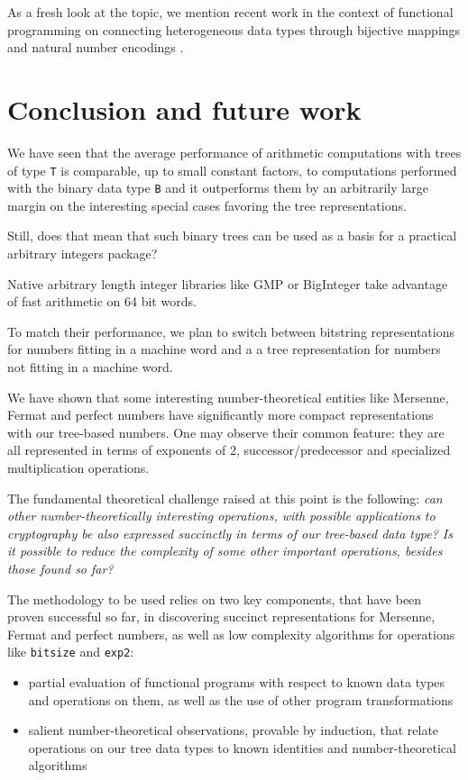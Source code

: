 \documentclass{TOOLS/llncs}
\begin{document}
As a fresh look at the topic, we mention 
recent work in the context of
functional programming on
connecting heterogeneous data types through
bijective mappings and natural number 
encodings \cite{everybit,complambda,calc10tarau}.


\section{Conclusion and future work} \label{concl}

We have seen that
the average performance of
arithmetic computations with  trees of type {\tt T}
is comparable, up to small constant
factors, to computations performed
with the binary data type {\tt B}
and it outperforms them by an arbitrarily large margin on the
interesting special cases favoring the tree representations.

Still, does that
mean that such binary trees can be used as a basis
for a practical arbitrary integers package?

Native arbitrary length integer libraries like
GMP or BigInteger
take advantage of fast arithmetic on 64 bit words.

To match their performance, we plan to
switch between
bitstring representations for
numbers fitting in a machine word
and a a
tree representation for numbers not
fitting in a machine word. 

We have shown that some interesting number-theoretical entities like
Mersenne, Fermat and perfect numbers have significantly more compact
representations with our tree-based numbers. One may observe their
common feature: they are all represented in terms of exponents of 2,
successor/predecessor and specialized multiplication operations.

The fundamental theoretical challenge raised at this point is the following:
{\em can other number-theoretically interesting operations, with possible
applications to cryptography be also
expressed succinctly in terms of our tree-based data type? Is it possible to reduce the
complexity of some other important operations, besides those found so far?}

The methodology to be used relies on two key components, that
have been proven successful so far, 
in discovering succinct representations for Mersenne, Fermat and perfect numbers,
as well as low complexity algorithms for operations like {\tt bitsize} and {\tt exp2}:
\begin{itemize}
\item partial evaluation  of functional programs with respect to known data types and operations on them,
 as well as the use of other program transformations
\item salient number-theoretical observations, provable by induction, 
that relate operations on our tree data types to known identities and number-theoretical algorithms
\end{itemize}
\end{document}
